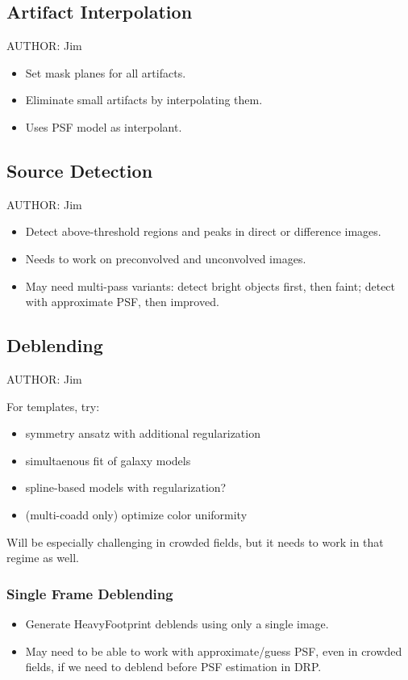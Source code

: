 \subsection{Artifact Interpolation}
\label{sec:acArtifactInterpolation}
AUTHOR: Jim
\begin{itemize}
\item Set mask planes for all artifacts.
\item Eliminate small artifacts by interpolating them.
\item Uses PSF model as interpolant.
\end{itemize}

\subsection{Source Detection}
\label{sec:acSourceDetection}
AUTHOR: Jim
\begin{itemize}
\item Detect above-threshold regions and peaks in direct or difference images.
\item Needs to work on preconvolved and unconvolved images.
\item May need multi-pass variants: detect bright objects first, then faint; detect with approximate PSF, then improved.
\end{itemize}

\subsection{Deblending}
\label{sec:acDeblending}
AUTHOR: Jim

For templates, try:
\begin{itemize}
\item symmetry ansatz with additional regularization
\item simultaenous fit of galaxy models
\item spline-based models with regularization?
\item (multi-coadd only) optimize color uniformity
\end{itemize}

Will be especially challenging in crowded fields, but it needs to work in that regime as well.

\subsubsection{Single Frame Deblending}
\label{sec:acSingleFrameDeblending}
\begin{itemize}
\item Generate HeavyFootprint deblends using only a single image.
\item May need to be able to work with approximate/guess PSF, even in crowded fields, if we need to deblend before PSF estimation in DRP.
\end{itemize}

